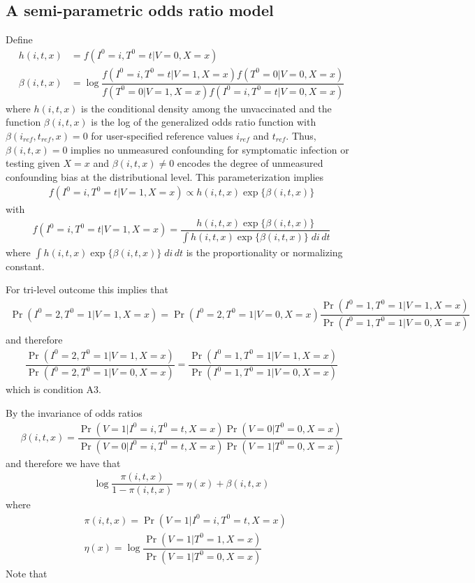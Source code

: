 \begin{appendix}
\subsection{A semi-parametric odds ratio model}
Define 
\begin{align*}
    h(i, t, x) &= f(I^0 = i, T^0 = t | V = 0, X = x) \\
    \beta(i, t,  x) &= \log \dfrac{f(I^0 = i, T^0 = t | V = 1, X = x)f(T^0 = 0 | V = 0, X = x)}{f(T^0 = 0 | V = 1, X = x)f(I^0 = i, T^0 = t | V = 0, X = x)}
\end{align*}
where $h(i, t, x)$ is the conditional density among the unvaccinated and the function $\beta(i, t,  x)$ is the log of the generalized odds ratio function with $\beta(i_{ref}, t_{ref},  x) = 0$ for user-specified reference values $i_{ref}$ and $t_{ref}$. Thus, $\beta(i, t,  x) = 0$ implies no unmeasured confounding for symptomatic infection or testing given $X = x$ and $\beta(i, t,  x) \neq 0$ encodes the degree of unmeasured confounding bias at the distributional level. This parameterization implies
\begin{align*}
    f(I^0 = i, T^0 = t | V = 1, X = x) \propto h(i, t, x) \exp\{\beta(i, t, x)\}
\end{align*}
with 
\begin{align*}
    f(I^0 = i, T^0 = t | V = 1, X = x) = \dfrac{h(i, t, x) \exp\{\beta(i, t, x)\}}{\int h(i, t, x) \exp\{\beta(i, t, x)\} \;di\,dt}
\end{align*}
where $\int h(i, t, x) \exp\{\beta(i, t, x)\} \;di\,dt$ is the proportionality or normalizing constant. 

For tri-level outcome this implies that
\begin{align*}
    \Pr(I^0 = 2, T^0 = 1 | V = 1, X = x) = \Pr(I^0 = 2, T^0 = 1 | V = 0, X = x)\dfrac{\Pr(I^0 = 1, T^0 = 1 | V = 1, X = x)}{\Pr(I^0 = 1, T^0 = 1 | V = 0, X = x)}
\end{align*}
and therefore 
\begin{align*}
    \dfrac{\Pr(I^0 = 2, T^0 = 1 | V = 1, X = x)}{\Pr(I^0 = 2, T^0 = 1 | V = 0, X = x)} = \dfrac{\Pr(I^0 = 1, T^0 = 1 | V = 1, X = x)}{\Pr(I^0 = 1, T^0 = 1 | V = 0, X = x)}
\end{align*}
which is condition A3.

By the invariance of odds ratios 
\begin{align*}
    \beta(i, t, x) = \dfrac{\Pr(V = 1 | I^0 = i, T^0 = t, X = x)\Pr(V = 0 | T^0 = 0, X = x)}{\Pr(V = 0 | I^0 = i, T^0 = t, X = x)\Pr(V = 1 | T^0 = 0, X = x)}
\end{align*}
and therefore we have that
\begin{align*}
    \log \dfrac{\pi(i, t, x)}{1 - \pi(i, t, x)} = \eta(x) + \beta(i, t, x)
\end{align*}
where
\begin{align*}
    &\pi(i, t, x) = \Pr(V = 1 | I^0 = i, T^0 = t, X = x) \\
    &\eta(x) = \log \dfrac{\Pr(V = 1 | T^0 = 1, X = x)}{\Pr(V = 1 | T^0 = 0, X = x)}
\end{align*}
Note that 


\end{appendix}
